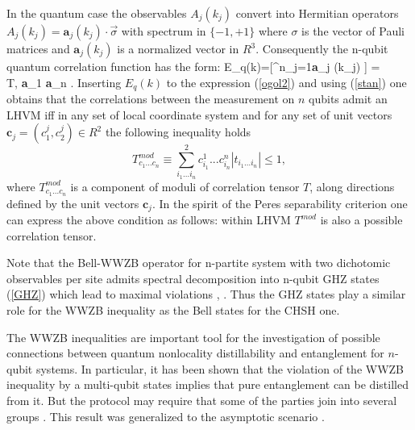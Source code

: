 \documentclass[twocolumn,aps,rmp]{revtex4}
\begin{document}
In the quantum case the observables $A_j(k_j)$ convert into Hermitian
operators $A_j(k_j)=\textbf{a}_j(k_j)\cdot \vec {\sigma} $ with
spectrum in $\{-1,+1\}$ where $\sigma $ is the vector of Pauli
matrices and $\textbf{a}_j(k_j)$ is a normalized vector in $R^3$.
Consequently the n-qubit quantum correlation function has the form:
\ben E_q(k)={\tr}[\rho \otimes ^n_{j=1}\textbf{a}_j (k_j)\cdot\vec
{\sigma}] = \nonumber \\ \<T, \textbf{a}_1\otimes \cdots\otimes\vec
\textbf{a}_n \>. \label{eq} \een Inserting $E_q(k)$ to the expression
(\ref{ogol2}) and using (\ref{stan}) one obtains that the correlations
between the measurement on $n$ qubits admit an LHVM iff in any set of
local coordinate system and for any set of unit vectors $\textbf{c}_j=
(c^j_1,c^j_2)\in R^2$ the following inequality holds \cite{ZB}
\begin{equation}
T^{mod}_{c_1...c_n}\equiv
\sum^2_{i_1...i_n}{c^1_{i_1}...c^n_{i_n}}|t_{{i_1}...{i_n}}|\leq  1,
\label{war}
\end{equation}
where $T^{mod}_{c_1...c_n}$ is a component of moduli of correlation
tensor $T$, along directions defined by the unit vectors
$\textbf{c}_j$. In the spirit of the Peres separability criterion one
can express the above condition as follows: within LHVM $T^{mod} $ is
also a possible correlation tensor.

Note that the Bell-WWZB operator for n-partite system with two
dichotomic observables per site admits spectral decomposition into
n-qubit GHZ states (\ref {GHZ}) which lead to maximal violations \cite
{Scarani}, \cite {WW}. Thus the GHZ states play a similar role for the
WWZB inequality as the Bell states for the CHSH one.

The WWZB inequalities are important tool for the investigation of
possible connections between quantum nonlocality distillability and
entanglement for $n$-qubit systems. In particular, it has been shown
that the violation of the WWZB inequality by a multi-qubit states
implies that pure entanglement can be distilled from it. But the
protocol may require that some of the parties join into several groups
\cite {Acin1,ASW}. This result was generalized to the asymptotic
scenario \cite {Masanes}.
\end{document}
